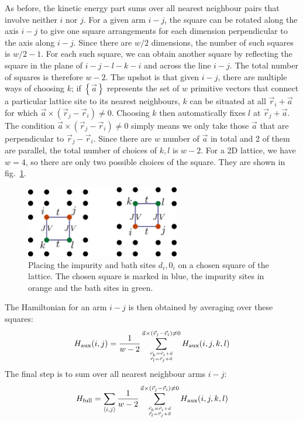 \documentclass[10pt]{report}
\numberwithin{equation}{section}
\begin{document}
As before, the kinetic energy part sums over all nearest neighbour pairs that involve neither \(i\) nor \(j\). For a given arm \(i-j\), the square can be rotated along the axis \(i-j\) to give one square arrangements for each dimension perpendicular to the axis along \(i-j\). Since there are \(w/2\) dimensions, the number of such squares is \(w/2 - 1\). For each such square, we can obtain another square by reflecting the square in the plane of \(i-j-l-k-i\) and across the line \(i-j\). The total number of squares is therefore \(w - 2\). The upshot is that given \(i-j\), there are multiple ways of choosing \(k\); if \(\left\{\vec a\right\}\) represents the set of \(w\) primitive vectors that connect a particular lattice site to its nearest neighbours, \(k\) can be situated at all \(\vec r_i + \vec a\) for which \(\vec a \times \left(\vec r_j - \vec r_i\right) \neq 0\). Choosing \(k\) then automatically fixes \(l\) at \(\vec r_j + \vec a\). The condition \(\vec a \times \left(\vec r_j - \vec r_i\right) \neq 0\) simply means we only take those \(\vec a\) that are perpendicular to \(\vec r_j - \vec r_i\). Since there are \(w\) number of \(\vec a\) in total and 2 of them are parallel, the total number of choices of \(k,l\) is \(w-2\).  For a 2D lattice, we have \(w=4\), so there are only two possible choices of the square. They are shown in fig.~\ref{square-arms-all}.
\begin{figure}[!htb]
	\centering
	\includegraphics[width=0.6\textwidth]{../figures/square_arms_all.pdf}
	\caption{Placing the impurity and bath sites \(d_i,0_i\) on a chosen square of the lattice. The chosen square is marked in blue, the impurity sites in orange and the bath sites in green.}
	\label{square-arms-all}
\end{figure}

The Hamiltonian for an arm \(i-j\) is then obtained by averaging over these squares:
\begin{equation}\begin{aligned}
	H_\text{aux}(i,j) = \frac{1}{w - 2}\sum_{\vec r_k = \vec r_i + \vec a \atop{\vec r_l = \vec r_j + \vec a}}^{\vec a \times \left(\vec r_j - \vec r_i\right) \neq 0}H_\text{aux}(i,j,k,l)
\end{aligned}\end{equation}
The final step is to sum over all nearest neighbour arms \(i-j\):
\begin{equation}\begin{aligned}
	\label{22siam_to_hubb}
	H_\text{full} = \sum_{\left<i,j\right>}\frac{1}{w - 2}\sum_{\vec r_k = \vec r_i + \vec a \atop{\vec r_l = \vec r_j + \vec a}}^{\vec a \times \left(\vec r_j - \vec r_i\right) \neq 0}H_\text{aux}(i,j,k,l)
\end{aligned}\end{equation}
\end{document}
